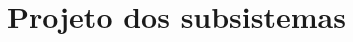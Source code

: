 




\maketitle

\vspace*{-1.2cm}

\begin{abstract}

\end{abstract}

\section{Projeto dos subsistemas}










